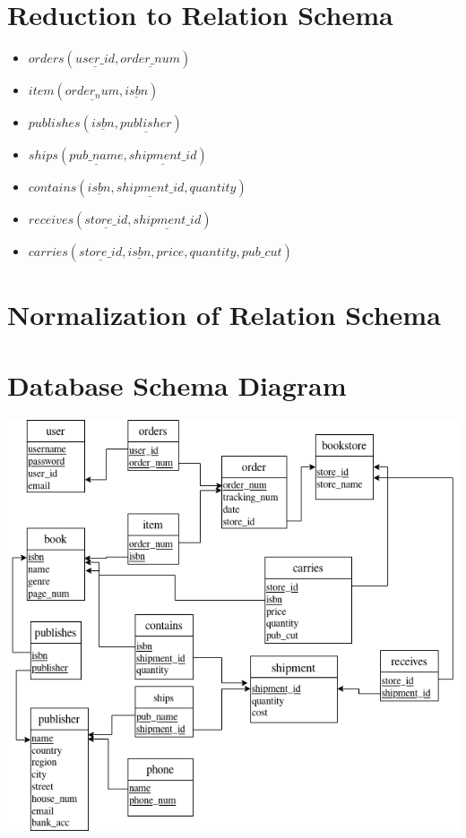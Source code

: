 \documentclass[titlepage, oneside]{article}
\begin{document}
    \section{Reduction to Relation Schema}
        \begin{itemize}
            \item $orders(\underline{user\_id}, \underline{order\_num})$
            \item $item(\underline{order_num}, \underline{isbn})$
            \item $publishes(\underline{isbn}, \underline{publisher})$
            \item $ships(\underline{pub\_name}, \underline{shipment\_id})$
            \item $contains(\underline{isbn}, \underline{shipment\_id}, quantity)$
            \item $receives(\underline{store\_id}, \underline{shipment\_id})$
            \item $carries(\underline{store\_id}, \underline{isbn}, price, quantity, pub\_cut)$
        \end{itemize}
    \section{Normalization of Relation Schema}
    \section{Database Schema Diagram}
        \begin{center}
            \includegraphics[scale=.6]{images/SchemaDiagram.png}
        \end{center}
\end{document}
